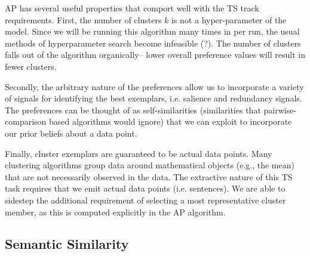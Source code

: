 \documentclass{sig-alternate}
\begin{document}
AP has several useful properties that comport well with the TS track 
requirements. First, the number of clusters $k$ is not a hyper-parameter
of the model. Since we will be running this algorithm many times in per run,
the usual methods of hyperparameter search become infeasible 
(?). The number of clusters falls out of the algorithm
organically-- lower overall preference values will result in fewer clusters. 

Secondly, the arbitrary nature of the preferences
allow us to incorporate a variety of signals for
identifying the best exemplars, i.e. salience and redundancy signals. 
The preferences can be thought of as self-similarities (similarities that
pairwise-comparison based algorithms would ignore) that we can exploit to 
incorporate our prior beliefs about a data point.

Finally, cluster exemplars are guaranteed to be actual data points. Many 
clustering algorithms group data around mathematical objects (e.g., the
mean) that are not necessarily observed in the data. The extractive nature of
this TS task requires that we emit actual data points (i.e. sentences).
We are able to sidestep 
the additional requirement of selecting a most
representative cluster member, as this is computed explicitly in the AP 
algorithm. 













\subsection{Semantic Similarity}\label{subsec:semsim}
\end{document}
